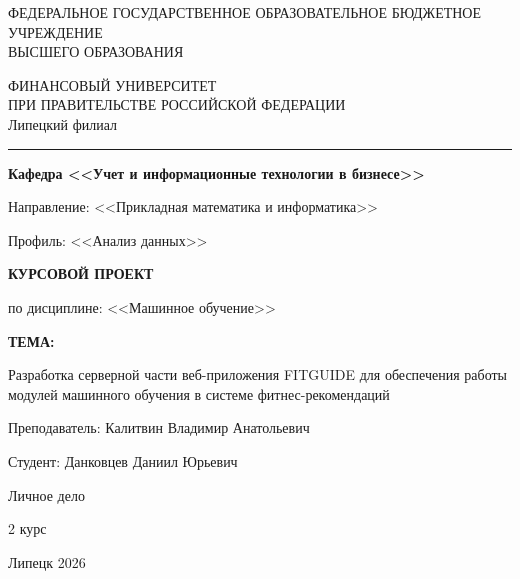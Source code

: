 \documentclass[14pt, a4paper]{extarticle}
\begin{document}
\sloppy
\thispagestyle{empty}

{\scriptsize
\begin{center}
ФЕДЕРАЛЬНОЕ ГОСУДАРСТВЕННОЕ ОБРАЗОВАТЕЛЬНОЕ БЮДЖЕТНОЕ УЧРЕЖДЕНИЕ\\
ВЫСШЕГО ОБРАЗОВАНИЯ
\end{center}
}

{\bf
\begin{center}
ФИНАНСОВЫЙ УНИВЕРСИТЕТ\\
ПРИ ПРАВИТЕЛЬСТВЕ РОССИЙСКОЙ ФЕДЕРАЦИИ\\
Липецкий филиал
\end{center}
}

\hrule
\bigskip

{\small
\begin{center}
\textbf{Кафедра <<Учет и информационные технологии в бизнесе>>}
\end{center}
}

\bigskip

Направление: <<Прикладная математика и информатика>>

\medskip
Профиль: <<Анализ данных>>

\vskip 2cm

\begin{center}
\textbf{КУРСОВОЙ ПРОЕКТ}
\end{center}

по дисциплине: <<Машинное обучение>>

\bigskip

\begin{center}
\textbf{ТЕМА:}\\
\parbox{0.8\textwidth}{
Разработка серверной части веб-приложения FITGUIDE для обеспечения работы модулей машинного обучения в системе фитнес-рекомендаций
}
\end{center}

\vskip 4cm

\begin{flushright}
Преподаватель: Калитвин Владимир Анатольевич

Студент: Данковцев Даниил Юрьевич

Личное дело 

2 курс
\end{flushright}

\vfill

\begin{center}
Липецк 2026
\end{center}

\tableofcontents
\newpage
\end{document}

